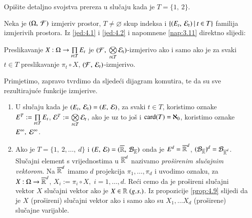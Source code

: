 \begin{zad} \label{zad:4.8}
    Opi\v site detaljno svojstva prereza u slu\v caju kada je $T = \{1, \: 2\}$.
\end{zad}

Neka je $(\Omega, \: \mathcal{F})$ izmjeriv prostor, $T \neq \varnothing$ skup indeksa i $\{{(E_t, \: \mathcal{E}_t)} \: | \: {t \in T}\}$ familija izmjerivih prostora.
Iz \eqref{jed:4.1} i \eqref{jed:4.2} i napomnene \ref{nap:3.11} direktno slijedi:

\begin{prop} \label{prop:4.9}
    Preslikavanje $X : \Omega \to \prod\limits_{t \in T}^{} E_t$ je $(\mathcal{F}, \: \bigotimes\limits_{t \in T}^{} \mathcal{E}_t)$-izmjerivo ako i samo ako je za svaki $t \in T$ preslikavanje $\pi_t \circ X$, $(\mathcal{F}, \: \mathcal{E}_t)$-izmjerivo.
\end{prop}

Primjetimo, zapravo tvrdimo da sljede\' ci dijagram komutira, te da su sve rezultiraju\' ce funkcije izmjerive.
\begin{figure}[H]
    \centering
\end{figure}

\begin{nap} \label{nap:4.10}
    \begin{enumerate}[label=(\alph*)]
        \item U slu\v caju kada je $(E_t, \: \mathcal{E}_t) = (E, \: \mathcal{E})$, za svaki $t \in T$, koristimo oznake $E^T := \prod\limits_{t \in T}^{} E_t$, $\mathcal{E}^T := \bigotimes\limits_{t \in T}^{} \mathcal{E}_t$, ako je uz to jo\v s i $\textnormal{card}({T}) = \aleph_0$, koristimo oznake $E^\infty, \; \mathcal{E}^\infty$.
        \item Ako je $T = \{1, \: 2, \dots, \: d\}$ i $(E, \: \mathcal{E}) = ({\overline{\mathbb{R}}}, \: {\mathcal{B}_{\overline{\mathbb{R}}}})$ onda je $E^d = \overline{\mathbb{R}}^d$, $(\mathcal{B}_{\overline{\mathbb{R}}})^d = \mathcal{B}_{\overline{\mathbb{R}}^d}$.
        Slu\v cajni element s vrijednostima u $\overline{\mathbb{R}}^d$ nazivamo \emph{pro\v sirenim slu\v cajnim vektorom}.
        Na $\overline{\mathbb{R}}^d$ imamo $d$ projekcija $\pi_1, \dots, \pi_d$ i uvodimo oznaku, za $X : \Omega \to \overline{\mathbb{R}}^d$, $X_i := \pi_i \circ X, \; i = 1, \dots, d$.
        Re\' ci cemo da je pro\v sireni slu\v cajni vektor $X$ slu\v cajni vektor ako je $X \in \mathbb{R} \; (g.s.)$.
        Iz propozicije \ref{prop:4.9} slijedi da je $X$ (pro\v sireni) slu\v cajni vektor ako i samo ako su $X_1, \dots X_d$ (pro\v sirene) slu\v cajne varijable.
    \end{enumerate}
\end{nap}

